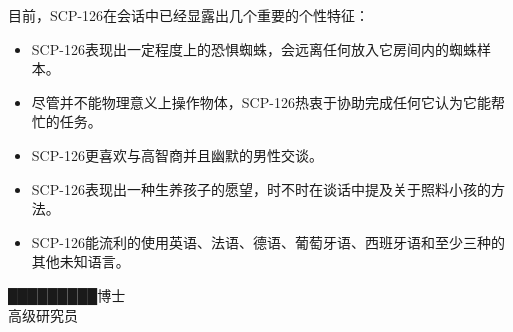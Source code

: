 \begin{scpbox}

目前，SCP-126在会话中已经显露出几个重要的个性特征：

\begin{itemize}
\item SCP-126表现出一定程度上的恐惧蜘蛛，会远离任何放入它房间内的蜘蛛样本。
\item 尽管并不能物理意义上操作物体，SCP-126热衷于协助完成任何它认为它能帮忙的任务。
\item SCP-126更喜欢与高智商并且幽默的男性交谈。
\item SCP-126表现出一种生养孩子的愿望，时不时在谈话中提及关于照料小孩的方法。
\item SCP-126能流利的使用英语、法语、德语、葡萄牙语、西班牙语和至少三种的其他未知语言。
\end{itemize}

█████████博士\\
高级研究员

\end{scpbox}
